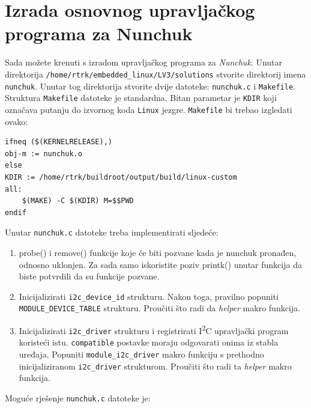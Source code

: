 \documentclass[11pt]{article}
\begin{document}
\section{Izrada osnovnog upravljačkog programa za Nunchuk}
Sada možete krenuti s izradom upravljačkog programa za \textit{Nunchuk}.
Unutar direktorija \texttt{/home/rtrk/embedded\_linux/LV3/solutions} stvorite
direktorij imena \texttt{nunchuk}. Unutar tog direktorija stvorite dvije
datoteke: \texttt{nunchuk.c} i \texttt{Makefile}.
\newline
\newline
Struktura \texttt{Makefile} datoteke je standardna. Bitan parametar je
\texttt{KDIR} koji označava putanju do izvornog koda \texttt{Linux} jezgre.
\newline
\newline
\texttt{Makefile} bi trebao izgledati ovako:
\begin{lstlisting}
ifneq ($(KERNELRELEASE),)
obj-m := nunchuk.o
else
KDIR := /home/rtrk/buildroot/output/build/linux-custom
all:
	$(MAKE) -C $(KDIR) M=$$PWD
endif
\end{lstlisting}
Unutar \texttt{nunchuk.c} datoteke treba implementirati sljedeće:
\begin{enumerate}
	\item probe() i remove() funkcije koje će biti pozvane kada je nunchuk
pronađen, odnosno uklonjen. Za sada samo iskoristite poziv printk() unutar
funkcija da biste potvrdili da su funkcije pozvane.
	\item Inicijalizirati \texttt{i2c\_device\_id} strukturu. Nakon toga,
		pravilno popuniti \texttt{MODULE\_DEVICE\_TABLE} strukturu. Proučiti
		što radi da \textit{helper} makro funkcija.
	\item Inicijalizirati \texttt{i2c\_driver} strukturu i registrirati
		I\textsuperscript{2}C upravljački program koristeći istu.
		\texttt{compatible} postavke moraju odgovarati onima iz stabla
		uređaja. Popuniti \texttt{module\_i2c\_driver} makro funkciju s
		prethodno inicijaliziranom \texttt{i2c\_driver} strukturom.
		Proučiti što radi ta \textit{helper} makro funkcija.
\end{enumerate}
\newpage
\noindent Moguće rješenje \texttt{nunchuk.c} datoteke je:
\end{document}
